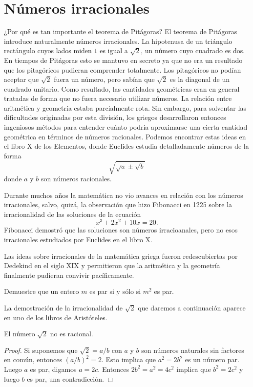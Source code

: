 \chapter{Números irracionales}

¿Por qué es tan importante el teorema de Pitágoras?  El teorema de Pitágoras
introduce naturalmente números irracionales. La hipotenusa de un triángulo
rectángulo cuyos lados miden $1$ es igual a $\sqrt{2}$, un número cuyo cuadrado
es dos.  En tiempos de Pitágoras esto se mantuvo en secreto ya que no era un
resultado que los pitagóricos pudieran comprender totalmente. Los pitagóricos
no podían aceptar que $\sqrt{2}$ fuera un número, pero sabían que $\sqrt{2}$ es
la diagonal de un cuadrado unitario. Como resultado, las cantidades geométricas
eran en general tratadas de forma que no fuera necesario utilizar números. La
relación entre aritmética y geometría estaba parcialmente rota. Sin embargo,
para solventar las dificultades originadas por esta división, los griegos
desarrollaron entonces ingeniosos métodos para entender cuánto podría
aproximarse una cierta cantidad geométrica en términos de números racionales.
Podemos encontrar estas ideas en el libro X de los Elementos, donde Euclides
estudia detalladamente números de la forma
\[
	\sqrt{\sqrt{a}\pm\sqrt{b}}
\]
donde $a$ y $b$ son números racionales. 

Durante muchos años la matemática no vio avances en relación con los números
irracionales, salvo, quizá, la observación que hizo Fibonacci en 1225 sobre la
irracionalidad de las soluciones de la ecuación 
\[
	x^3+2x^2+10x=20.
\]
Fibonacci demostró que las soluciones son números irracioanales, pero no esos
irracionales estudiados por Euclides en el libro X. 

Las ideas sobre irracionales de la matemática griega fueron redescubiertas por
Dedekind en el siglo XIX y permitieron que la aritmética y la geometría
finalmente pudieran convivir pacíficamente.

\begin{exercise}
	Demuestre que un entero $m$ es par si y sólo si $m^2$ es par.
\end{exercise}

La demostración de la irracionalidad de $\sqrt{2}$ que daremos a continuación
aparece en uno de los libros de Aristóteles.

\begin{theorem}
	El número $\sqrt{2}$ no es racional.	
\end{theorem}

\begin{proof}
	Si suponemos que $\sqrt{2}=a/b$ con $a$ y $b$ son números naturales sin
	factores en común, entonces $(a/b)^2=2$. Esto implica que $a^2=2b^2$ es un
	número par. Luego $a$ es par, digamos $a=2c$. Entonces $2b^2=a^2=4c^2$
	implica que $b^2=2c^2$ y luego $b$ es par, una contradicción.
\end{proof}

